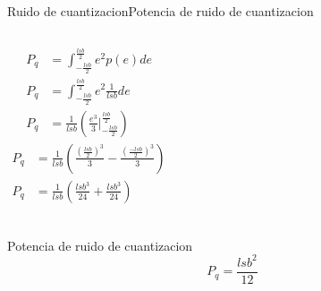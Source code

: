    \begin{frame}{Ruido de cuantizacion}{Potencia de ruido de cuantizacion}
      \begin{columns}[onlytextwidth]
         \begin{align*}
            P_q &= \int^\frac{lsb}{2}_{-\frac{lsb}{2}} e^2 p(e) de \\
            P_q &= \int^\frac{lsb}{2}_{-\frac{lsb}{2}} e^2 \frac{1}{lsb} de \\
            P_q &= \frac{1}{lsb}\left(\frac{e^3}{3} \Big\rvert^{\frac{lsb}{2}}_{-\frac{lsb}{2}}\right)
         \end{align*}
         \begin{align*}
            P_q &= \frac{1}{lsb}\left(\frac{(\frac{lsb}{2})^3}{3} - \frac{(\frac{-lsb}{2})^3}{3}\right)\\
            P_q &= \frac{1}{lsb} \left(\frac{lsb^3}{24} + \frac{lsb^3}{24}\right) \\
         \end{align*}
      \end{columns}
      \begin{block}{Potencia de ruido de cuantizacion}
         \begin{equation}
            P_q = \frac{lsb^2}{12}
         \end{equation}
      \end{block}
      \vfill
   \end{frame}
